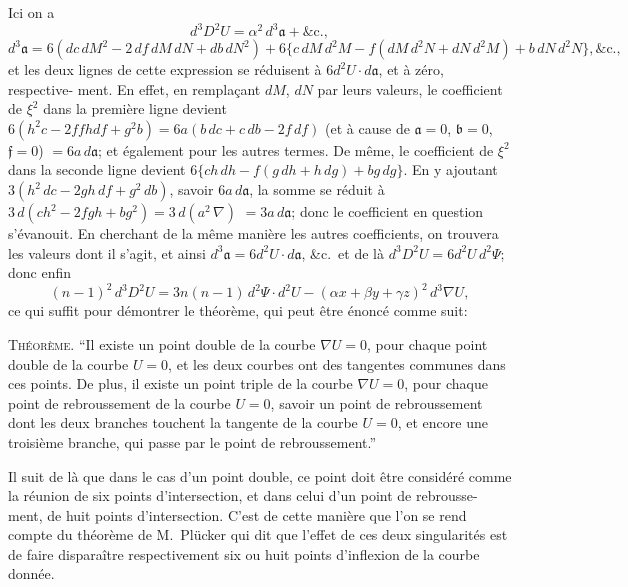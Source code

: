 \documentclass[11pt]{article}
\begin{document}
Ici on a
\[
d^{3} D^{2} U = \alpha^{2}\,d^{3}\mathfrak{a} + \&\text{c.},
\]
\[
d^{3}\mathfrak{a} = 6(d c\,d M^{2} - 2\,d f\,d M\,d N + d b\,d N^{2}) + 6\{c\,d M\,d^{2} M - f(d M\,d^{2} N + d N\,d^{2} M) + b\,d N\,d^{2} N\}, \&\text{c.},
\]
et les deux lignes de cette expression se r\'eduisent \`a $6 d^{2} U \cdot d \mathfrak{a}$, et \`a z\'ero, respective-
ment. En effet, en rempla\c{c}ant $d M$, $d N$ par leurs valeurs, le coefficient de $\xi^{2}$ dans la
premi\`ere ligne devient $6(h^{2} c - 2 f f h d f + g^{2} b) = 6 a(b\,d c + c\,d b - 2 f\,d f)$ (et \`a cause de $\mathfrak{a} = 0$,
$\mathfrak{b} = 0$, $\mathfrak{f} = 0$) $= 6 a\,d\mathfrak{a}$; et \'egalement pour les autres termes. De m\^eme, le coefficient
de $\xi^{2}$ dans la seconde ligne devient $6\{c h\,d h - f(g\,d h + h\,d g) + b g\,d g\}$. En y ajoutant
$3(h^{2}\,d c - 2 g h\,d f + g^{2}\,d b)$, savoir $6 a\,d\mathfrak{a}$, la somme se r\'eduit \`a $3\,d(c h^{2} - 2 f g h + b g^{2}) = 3\,d(a^{2}\,\nabla)$
$= 3 a\,d\mathfrak{a}$; donc le coefficient en question s'\'evanouit. En cherchant de la m\^eme mani\`ere
les autres coefficients, on trouvera les valeurs dont il s'agit, et ainsi $d^{3}\mathfrak{a} = 6 d^{2} U \cdot d\mathfrak{a}$,
\&c.\ et de l\`a $d^{3} D^{2} U = 6 d^{2} U\,d^{2}\Psi$; donc enfin
\[
(n - 1)^{2}\,d^{3} D^{2} U = 3 n(n - 1)\,d^{2}\Psi \cdot d^{2} U - (\alpha x + \beta y + \gamma z)^{2}\,d^{3} \nabla U,
\]
ce qui suffit pour d\'emontrer le th\'eor\`eme, qui peut \^etre \'enonc\'e comme suit:

\medskip
\noindent\textsc{Th\'eor\`eme.} ``Il existe un point double de la courbe $\nabla U = 0$, pour chaque point
double de la courbe $U = 0$, et les deux courbes ont des tangentes communes dans
ces points. De plus, il existe un point triple de la courbe $\nabla U = 0$, pour chaque point
de rebroussement de la courbe $U = 0$, savoir un point de rebroussement dont les deux
branches touchent la tangente de la courbe $U = 0$, et encore une troisi\`eme branche,
qui passe par le point de rebroussement.''

\medskip
Il suit de l\`a que dans le cas d'un point double, ce point doit \^etre consid\'er\'e
comme la r\'eunion de six points d'intersection, et dans celui d'un point de rebrousse-
ment, de huit points d'intersection. C'est de cette mani\`ere que l'on se rend compte
du th\'eor\`eme de M.~Pl\"ucker qui dit que l'effet de ces deux singularit\'es est de faire
dispara\^itre respectivement six ou huit points d'inflexion de la courbe donn\'ee.
\end{document}

